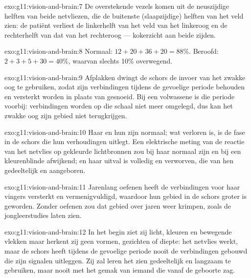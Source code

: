 \begin{solution}{exo:g11:vision-and-brain:7}
De overstekende vezels komen uit de neuszijdige helften van beide
netvliezen, die de buitenste (slaapzijdige) helften van het veld zien: de
patiënt verliest de linkerhelft van het veld van het linkeroog en de
rechterhelft van dat van het rechteroog --- kokerzicht aan beide zijden.
\end{solution}

\begin{solution}{exo:g11:vision-and-brain:8}
Normaal: $12 + 20 + 36 + 20 = 88\%$. Beroofd: $2 + 3 + 5 + 30 = 40\%$,
waarvan slechts 10\% overwegend.
\end{solution}

\begin{solution}{exo:g11:vision-and-brain:9}
Afplakken dwingt de schors de invoer van het zwakke oog te gebruiken,
zodat zijn verbindingen tijdens de gevoelige periode behouden en versterkt
worden in plaats van gesnoeid. Bij een volwassene is die periode voorbij:
verbindingen worden op die schaal niet meer omgelegd, dus kan het zwakke
oog zijn gebied niet terugkrijgen.
\end{solution}

\begin{solution}{exo:g11:vision-and-brain:10}
Haar  en hun  zijn normaal; wat verloren is, is de fase in
de schors die hun verhoudingen uitlegt. Een elektrische meting van de
reactie van het netvlies op gekleurde lichtbronnen zou bij haar normaal
zijn en bij een kleurenblinde afwijkend; en haar uitval is volledig en
verworven, die van hen gedeeltelijk en aangeboren.
\end{solution}

\begin{solution}{exo:g11:vision-and-brain:11}
Jarenlang oefenen heeft de verbindingen voor haar vingers versterkt en
vermenigvuldigd, waardoor hun gebied in de schors groter is geworden.
Zonder oefenen zou dat gebied over jaren weer krimpen, zoals de
jongleerstudies laten zien.
\end{solution}

\begin{solution}{exo:g11:vision-and-brain:12}
In het begin ziet zij licht, kleuren en bewegende vlekken maar herkent zij
geen vormen, gezichten of diepte: het netvlies werkt, maar de schors heeft
tijdens de gevoelige periode nooit de verbindingen gebouwd die zijn
signalen uitleggen. Zij zal leren het zien gedeeltelijk en langzaam te
gebruiken, maar nooit met het gemak van iemand die vanaf de geboorte zag.
\end{solution}

